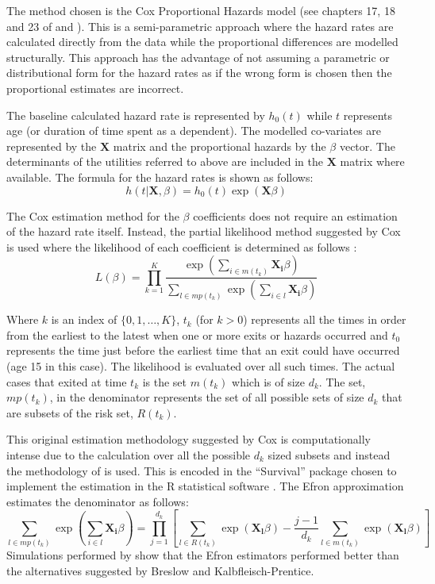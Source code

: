 \documentclass[12pt]{article}
\begin{document}
The method chosen is the Cox Proportional Hazards model (see chapters 17, 18 and 23 of \cite{cameron2005microeconometrics} and \cite{brostrom2012event}). This is a semi-parametric approach where the hazard rates are calculated directly from the data while the proportional differences are modelled structurally. This approach has the advantage of not assuming a parametric or distributional form for the hazard rates as if the wrong form is chosen then the proportional estimates are incorrect.

The baseline calculated hazard rate is represented by $h_0(t)$ while $t$ represents age (or  duration of time spent as a dependent). The modelled co-variates are represented by the $\mathbf{X}$ matrix and the proportional hazards by the $\beta$ vector. The determinants of the utilities referred to above are included in the $\mathbf{X}$ matrix where available. The formula for the hazard rates is shown as follows:
\[h(t|\mathbf{X}, \beta) = h_0( t ) \exp ( \mathbf{X}  \beta )\]

The Cox estimation method for the $\beta$ coefficients does not require an estimation of the hazard rate itself. Instead, the partial likelihood method suggested by Cox is used where the likelihood of each coefficient is determined as follows \parencite{cox1972regression}:
\[ L(\beta) = \prod_{k = 1}^{K} \frac{\exp ( \sum_{i \in m(t_k)}\mathbf{ X_i}  \beta )}{\sum_{l \in mp(t_k)}\exp ( \sum_{i \in l}\mathbf{X_i}  \beta ) }  \]

Where $k$ is an index of $\{0, 1, \dots, K\}$, $t_k$ (for $k>0$) represents all the times in order from the earliest to the latest when one or more exits or hazards occurred and $t_0$ represents the time just before the earliest time that an exit could have occurred (age 15 in this case). The likelihood is evaluated over all such times. The actual cases that exited at time $t_k$ is the set $m(t_k)$ which is of size $d_k$. The set, $mp(t_k)$, in the denominator represents the set of all possible sets of size $d_k$ that are subsets of the risk set, $R(t_k)$.

This original estimation methodology suggested by Cox is computationally intense due to the calculation over all the possible $d_k$ sized subsets and instead the methodology of \cite{efron1977efficiency} is used. This is encoded in the ``Survival'' package chosen to implement the estimation in the R statistical software \parencite{survival}. The Efron approximation estimates the denominator as follows:
\[  \sum_{l \in mp(t_k)}\exp \left( \sum_{i \in l}\mathbf{X_i}  \beta \right) = \prod_{j=1}^{d_k}\left[\sum_{l \in R(t_k)}\exp(\mathbf{X_l}\beta) - \frac{j-1}{d_k}\sum_{l \in m(t_k)} \exp (\mathbf{X_l}\beta) \right] \]
Simulations performed by \cite{hertz1997validity} show that the Efron estimators performed better than the alternatives suggested by Breslow and Kalbfleisch-Prentice.
\end{document}
